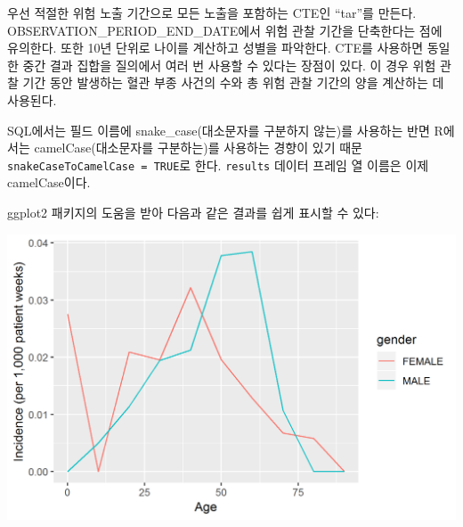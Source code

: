 \documentclass[11pt]{book}
\newenvironment{Shaded}{\begin{snugshade}}{\end{snugshade}}
\newcommand{\KeywordTok}[1]{\textcolor[rgb]{0.13,0.29,0.53}{\textbf{#1}}}
\newcommand{\DataTypeTok}[1]{\textcolor[rgb]{0.13,0.29,0.53}{#1}}
\newcommand{\DecValTok}[1]{\textcolor[rgb]{0.00,0.00,0.81}{#1}}
\newcommand{\StringTok}[1]{\textcolor[rgb]{0.31,0.60,0.02}{#1}}
\newcommand{\CommentTok}[1]{\textcolor[rgb]{0.56,0.35,0.01}{\textit{#1}}}
\newcommand{\OperatorTok}[1]{\textcolor[rgb]{0.81,0.36,0.00}{\textbf{#1}}}
\newcommand{\NormalTok}[1]{#1}
\theoremstyle{definition}
\theoremstyle{definition}
\theoremstyle{definition}
\theoremstyle{remark}
\begin{document}
우선 적절한 위험 노출 기간으로 모든 노출을 포함하는 CTE인 ``tar''를
만든다. OBSERVATION\_PERIOD\_END\_DATE에서 위험 관찰 기간을 단축한다는
점에 유의한다. 또한 10년 단위로 나이를 계산하고 성별을 파악한다. CTE를
사용하면 동일한 중간 결과 집합을 질의에서 여러 번 사용할 수 있다는
장점이 있다. 이 경우 위험 관찰 기간 동안 발생하는 혈관 부종 사건의 수와
총 위험 관찰 기간의 양을 계산하는 데 사용된다.

SQL에서는 필드 이름에 snake\_case(대소문자를 구분하지 않는)를 사용하는
반면 R에서는 camelCase(대소문자를 구분하는)를 사용하는 경향이 있기 때문
\texttt{snakeCaseToCamelCase\ =\ TRUE}로 한다. \texttt{results} 데이터
프레임 열 이름은 이제 camelCase이다.

ggplot2 패키지의 도움을 받아 다음과 같은 결과를 쉽게 표시할 수 있다:

\begin{Shaded}
\end{Shaded}

\begin{center}\includegraphics[width=0.8\linewidth]{images/SqlAndR/ir} \end{center}
\end{document}
